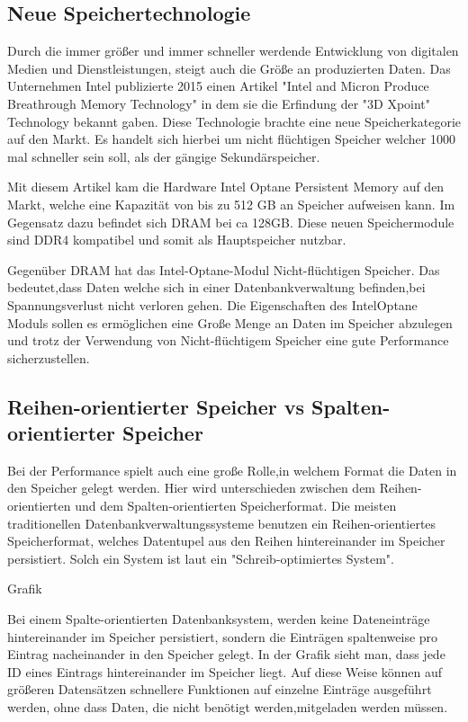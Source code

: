\subsection{Neue Speichertechnologie}
Durch die immer größer und immer schneller werdende Entwicklung von digitalen Medien und Dienstleistungen, steigt auch die Größe an produzierten Daten. 
Das Unternehmen Intel publizierte 2015 einen Artikel "Intel and Micron Produce Breathrough Memory Technology" in dem sie die Erfindung der "3D Xpoint" Technology bekannt gaben. Diese Technologie brachte eine neue Speicherkategorie auf den Markt. Es handelt sich hierbei um nicht flüchtigen Speicher welcher 1000 mal schneller sein soll, als der gängige Sekundärspeicher. \cite{Intel:MemoryTechnology}

Mit diesem Artikel kam die Hardware Intel Optane Persistent Memory auf den Markt, welche eine Kapazität von bis zu 512 GB an Speicher aufweisen kann.
Im Gegensatz dazu befindet sich DRAM bei ca 128GB.
Diese neuen Speichermodule sind DDR4 kompatibel und somit als Hauptspeicher nutzbar. \cite{IntelOptane:Micron}

Gegenüber DRAM hat das Intel-Optane-Modul Nicht-flüchtigen Speicher. Das bedeutet,dass  Daten welche sich in einer Datenbankverwaltung befinden,bei Spannungsverlust nicht verloren gehen.
Die Eigenschaften des IntelOptane Moduls sollen es ermöglichen eine Große Menge an Daten im Speicher abzulegen und trotz der Verwendung von Nicht-flüchtigem Speicher eine gute Performance sicherzustellen.
 
\subsection{Reihen-orientierter Speicher vs Spalten-orientierter Speicher}
Bei der Performance spielt auch eine große Rolle,in welchem Format die Daten in den Speicher gelegt werden. Hier wird unterschieden zwischen dem Reihen-orientierten und dem Spalten-orientierten Speicherformat.
Die meisten traditionellen Datenbankverwaltungssysteme benutzen ein Reihen-orientiertes Speicherformat, welches Datentupel aus den Reihen hintereinander im Speicher persistiert. Solch ein System ist laut \cite{Stonebraker2005CStoreAC} ein "Schreib-optimiertes System".

Grafik

Bei einem Spalte-orientierten Datenbanksystem, werden keine Dateneinträge hintereinander im Speicher persistiert, sondern die Einträgen spaltenweise pro Eintrag nacheinander in den Speicher gelegt. In der Grafik sieht man, dass jede ID eines Eintrags hintereinander im Speicher liegt. Auf diese Weise können auf größeren Datensätzen schnellere Funktionen auf einzelne Einträge ausgeführt werden, ohne dass Daten, die nicht benötigt werden,mitgeladen werden müssen.

